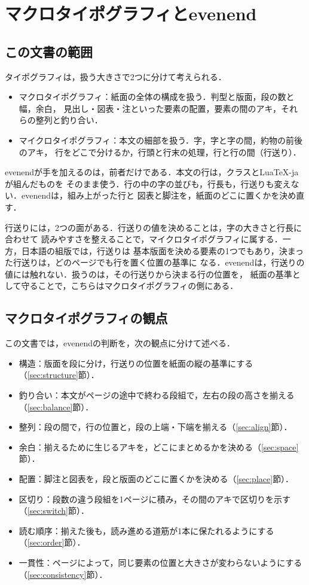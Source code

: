 \documentclass[twocolumn,paper=a4,fontsize=10pt]{jlreq}
\providecommand\LuaTeX{Lua\TeX}
\begin{document}
\section{マクロタイポグラフィとevenend}

\subsection{この文書の範囲}

タイポグラフィは，扱う大きさで2つに分けて考えられる．
\begin{itemize}
  \item マクロタイポグラフィ：紙面の全体の構成を扱う．判型と版面，段の数と幅，余白，
    見出し・図表・注といった要素の配置，要素の間のアキ，それらの整列と釣り合い．
  \item マイクロタイポグラフィ：本文の細部を扱う．字，字と字の間，約物の前後のアキ，
    行をどこで分けるか，行頭と行末の処理，行と行の間（行送り）．
\end{itemize}
evenendが手を加えるのは，前者だけである．本文の行は，クラスと\LuaTeX-jaが組んだものを
そのまま使う．行の中の字の並びも，行長も，行送りも変えない．evenendは，組み上がった行と
図表と脚注を，紙面のどこに置くかを決め直す．

行送りには，2つの面がある．行送りの値を決めることは，字の大きさと行長に合わせて
読みやすさを整えることで，マイクロタイポグラフィに属する．一方，日本語の組版では，行送りは
基本版面を決める要素の1つでもあり，決まった行送りは，どのページでも行を置く位置の基準に
なる．evenendは，行送りの値には触れない．扱うのは，その行送りから決まる行の位置を，
紙面の基準として守ることで，こちらはマクロタイポグラフィの側にある．

\subsection{マクロタイポグラフィの観点}

この文書では，evenendの判断を，次の観点に分けて述べる．
\begin{itemize}
  \item 構造：版面を段に分け，行送りの位置を紙面の縦の基準にする（\ref{sec:structure}節）．
  \item 釣り合い：本文がページの途中で終わる段組で，左右の段の高さを揃える
    （\ref{sec:balance}節）．
  \item 整列：段の間で，行の位置と，段の上端・下端を揃える（\ref{sec:align}節）．
  \item 余白：揃えるために生じるアキを，どこにまとめるかを決める（\ref{sec:space}節）．
  \item 配置：脚注と図表を，段と版面のどこに置くかを決める（\ref{sec:place}節）．
  \item 区切り：段数の違う段組を1ページに積み，その間のアキで区切りを示す
    （\ref{sec:switch}節）．
  \item 読む順序：揃えた後も，読み進める道筋が1本に保たれるようにする（\ref{sec:order}節）．
  \item 一貫性：ページによって，同じ要素の位置と大きさが変わらないようにする
    （\ref{sec:consistency}節）．
\end{itemize}
\end{document}
